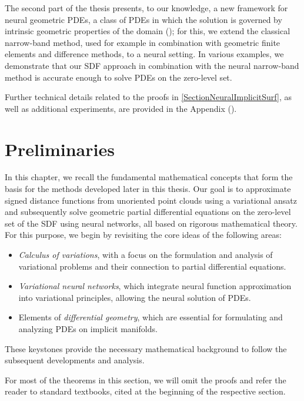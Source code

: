 \documentclass[12pt,openany]{book}
\theoremstyle{plainnormal}
\theoremstyle{remark}
\begin{document}
The second part of the thesis presents, to our knowledge, a new framework for neural geometric PDEs, a class of PDEs in which the solution is governed by intrinsic geometric properties of the domain (); for this, we extend the classical narrow-band method, used for example in combination with geometric finite elements and difference methods, to a neural setting. In various examples, we demonstrate that our SDF approach in combination with the neural narrow-band method is accurate enough to solve PDEs on the zero-level set.\par
Further technical details related to the proofs in \cref{SectionNeuralImplicitSurf}, as well as additional experiments, are provided in the Appendix ().
\newpage
{}
\chapter{Preliminaries}\label{ch:prelim}
In this chapter, we recall the fundamental mathematical concepts that form the basis for the methods developed later in this thesis. Our goal is to approximate signed distance functions from unoriented point clouds using a variational ansatz and subsequently solve geometric partial differential equations on the zero-level set of the SDF using neural networks, all based on rigorous mathematical theory. For this purpose, we begin by revisiting the core ideas of the following areas:
\begin{itemize}
    \item \emph{Calculus of variations}, with a focus on the formulation and analysis of variational problems and their connection to partial differential equations.
    
    \item \emph{Variational neural networks}, which integrate neural function approximation into variational principles, allowing the neural solution of PDEs.
    
    \item Elements of \emph{differential geometry}, which are essential for formulating and analyzing PDEs on implicit manifolds.
\end{itemize}
These keystones provide the necessary mathematical background to follow the subsequent developments and analysis.\par
For most of the theorems in this section, we will omit the proofs and refer the reader to standard textbooks, cited at the beginning of the respective section.
\end{document}
